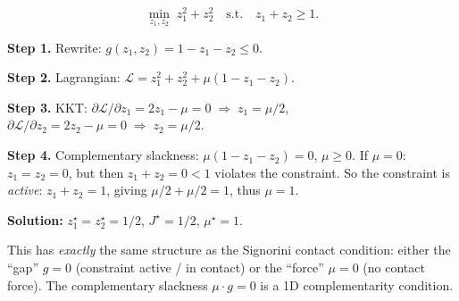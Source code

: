 \documentclass[11pt,twoside]{report}
\theoremstyle{definition}
\theoremstyle{plain}
\theoremstyle{remark}
\newcommand{\0}{\bm{0}}
\begin{document}
\begin{examplebox}
\begin{equation*}
\min_{z_1,z_2}\; z_{1}^{2}+z_{2}^{2}
\quad\text{s.t.}\quad z_{1}+z_{2}\ge 1.
\end{equation*}

\textbf{Step 1.} Rewrite: $g(z_{1},z_{2})=1-z_{1}-z_{2}\le 0$.

\textbf{Step 2.} Lagrangian: $\mathcal{L}=z_{1}^{2}+z_{2}^{2}+\mu(1-z_{1}-z_{2})$.

\textbf{Step 3.} KKT:
$\partial\mathcal{L}/\partial z_{1}=2z_{1}-\mu=0\;\Rightarrow\;z_{1}=\mu/2$,\quad
$\partial\mathcal{L}/\partial z_{2}=2z_{2}-\mu=0\;\Rightarrow\;z_{2}=\mu/2$.

\textbf{Step 4.} Complementary slackness: $\mu(1-z_{1}-z_{2})=0$, $\mu\ge 0$.
If $\mu=0$: $z_{1}=z_{2}=0$, but then $z_{1}+z_{2}=0<1$ violates the constraint.
So the constraint is \emph{active}: $z_{1}+z_{2}=1$, giving $\mu/2+\mu/2=1$, thus $\mu=1$.

\textbf{Solution:} $z_{1}^{\star}=z_{2}^{\star}=1/2$, $J^{\star}=1/2$, $\mu^{\star}=1$.

\begin{warningbox}
This has \emph{exactly} the same structure as the Signorini contact condition:
either the ``gap'' $g=0$ (constraint active / in contact) or the ``force'' $\mu=0$ (no contact force).
The complementary slackness $\mu\cdot g=0$ is a 1D complementarity condition.
\end{warningbox}
\end{examplebox}

\begin{center}
\end{center}
\end{document}
